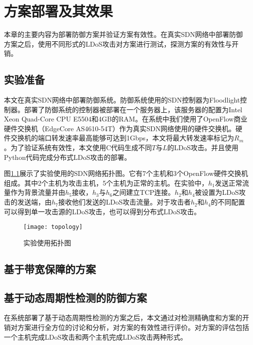 \chapter{方案部署及其效果}
\label{cha:experiment}
本章的主要内容为部署防御方案并验证方案有效性。在真实SDN网络中部署防御方案之后，使用不同形式的LDoS攻击对方案进行测试，探测方案的有效性与开销。

\section{实验准备}
\label{chap5:setup}
本文在真实SDN网络中部署防御系统。防御系统使用的SDN控制器为Floodlight控制器。部署了防御系统的控制器被部署在一个服务器上，该服务器的配置为Intel Xeon Quad-Core CPU E5504和4GB的RAM。在系统中我们使用了OpenFlow商业硬件交换机（EdgeCore AS4610-54T）作为真实SDN网络使用的硬件交换机。硬件交换机的端口转发速率最高能够可达到1Gbps，本文将最大转发速率标记为$R_m$。为了验证系统有效性，本文使用C代码生成不同$T$与$L$的LDoS攻击。并且使用Python代码完成分布式LDoS攻击的部署。

图\ref{fig:topology}展示了实验使用的SDN网络拓扑图。它有7个主机和3个OpenFlow硬件交换机组成。其中2个主机为攻击主机，5个主机为正常的主机。在实验中，$h_1$发送正常流量作为背景流量并由$h_5$接收，$h_3$与$h_6$之间建立TCP连接。$h_2$和$h_4$被设置为LDoS攻击的发送端，由$h_7$接收他们发送的LDoS攻击流量。对于攻击者$h_2$和$h_4$的不同配置可以得到单一攻击源的LDoS攻击，也可以得到分布式LDoS攻击。


\begin{figure}
    \centering
    \texttt{[image: topology]}
    \caption{实验使用拓扑图}
    \label{fig:topology}
\end{figure}


\section{基于带宽保障的方案}
\label{chap5:}


\section{基于动态周期性检测的防御方案}
\label{chap5:expperioddetection}
在系统部署了基于动态周期性检测的方案之后，本文通过对检测精确度和方案的开销对方案进行全方位的讨论和分析，对方案的有效性进行评价。对方案的评估包括一个主机完成LDoS攻击和两个主机完成LDoS攻击两种形式。

